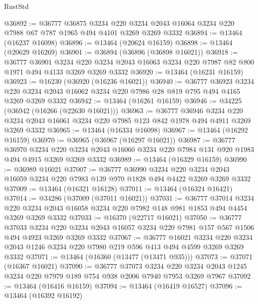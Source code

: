 \begin{lexlean}{RustStd}
\begin{coremodule}
@36892 := @36777
    @36875
    @3234
    @220
    @3234
    @2043
    @16064
    @3234
    @220
    @7988
    @67
    @787
    @1965
    @494
    @4101
    @3269
    @3269
    @3332
@36894 := @13464 (@16237 @16098)
@36896 := @13464 (@20624 @16159)
@36898 := @13464 (@20629 @16269)
@36901 := @36894 (@36896 (@36898 @16021))
@36918 := @36777
    @36901
    @3234
    @220
    @3234
    @2043
    @16063
    @3234
    @220
    @7987
    @82
    @800
    @1971
    @494
    @4133
    @3269
    @3269
    @3332
@36920 := @13464 (@16231 @16159)
@36923 := @16230 (@36920 (@16236 @16021))
@36940 := @36777
    @36923
    @3234
    @220
    @3234
    @2043
    @16062
    @3234
    @220
    @7986
    @28
    @819
    @795
    @494
    @4165
    @3269
    @3269
    @3332
@36942 := @13464 (@16261 @16159)
@36946 := @34225 (@36942 (@16266 (@22630 @16021)))
@36963 := @36777
    @36946
    @3234
    @220
    @3234
    @2043
    @16061
    @3234
    @220
    @7985
    @123
    @842
    @1978
    @494
    @4911
    @3269
    @3269
    @3332
@36965 := @13464 (@16334 @16098)
@36967 := @13464 (@16292 @16159)
@36970 := @36965 (@36967 (@16297 @16021))
@36987 := @36777
    @36970
    @3234
    @220
    @3234
    @2043
    @16060
    @3234
    @220
    @7984
    @131
    @920
    @1983
    @494
    @4915
    @3269
    @3269
    @3332
@36989 := @13464 (@16329 @16159)
@36990 := @36989 @16021
@37007 := @36777
    @36990
    @3234
    @220
    @3234
    @2043
    @16059
    @3234
    @220
    @7983
    @139
    @970
    @1828
    @494
    @4422
    @3269
    @3269
    @3332
@37009 := @13464 (@16321 @16128)
@37011 := @13464 (@16324 @16421)
@37014 := @34286 (@37009 (@37011 @16021))
@37031 := @36777
    @37014
    @3234
    @220
    @3234
    @2043
    @16058
    @3234
    @220
    @7982
    @148
    @981
    @1853
    @494
    @4454
    @3269
    @3269
    @3332
@37033 := @16370 (@22717 @16021)
@37050 := @36777
    @37033
    @3234
    @220
    @3234
    @2043
    @16057
    @3234
    @220
    @7981
    @157
    @567
    @1506
    @494
    @4923
    @3269
    @3269
    @3332
@37067 := @36777
    @16021
    @3234
    @220
    @3234
    @2043
    @1246
    @3234
    @220
    @7980
    @219
    @596
    @413
    @494
    @4599
    @3269
    @3269
    @3332
@37071 := @13464 (@16360 (@13477 (@13471 @935)))
@37073 := @37071 (@16367 @16021)
@37090 := @36777
    @37073
    @3234
    @220
    @3234
    @2043
    @1245
    @3234
    @220
    @7979
    @189
    @754
    @938
    @2006
    @7940
    @7953
    @3269
    @7967
@37092 := @13464 (@16416 @16159)
@37094 := @13464 (@16419 @16527)
@37096 := @13464 (@16392 @16192)

\end{coremodule}
\end{lexlean}
